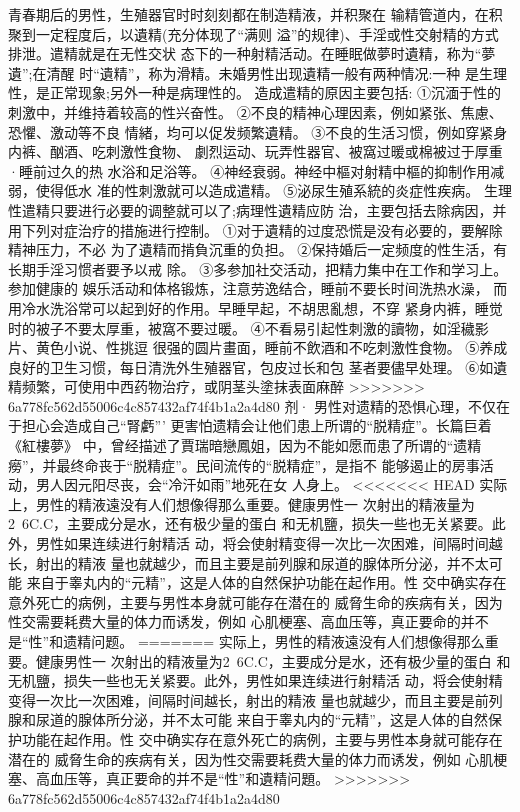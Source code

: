 \documentclass[12pt,UTF8]{ctexbook}
\begin{document}
青春期后的男性，生殖器官时时刻刻都在制造精液，并积聚在
输精管道内，在积聚到一定程度后，以遺精(充分体现了“满则
溢”的规律)、手淫或性交射精的方式排泄。遣精就是在无性交状
态下的一种射精活动。在睡眠做夢时遺精，称为“夢遺”;在清醒
时“遺精”，称为滑精。未婚男性出现遺精一般有两种情况:一种
是生理性，是正常现象;另外一种是病理性的。
造成遣精的原因主要包括:
①沉湎于性的刺激中，并维持着较高的性兴奋性。
②不良的精神心理因素，例如紧张、焦慮、恐懼、激动等不良
情緒，均可以促发频繁遺精。
③不良的生活习惯，例如穿紧身内裤、酗酒、吃刺激性食物、
劇烈运动、玩弄性器官、被窩过暖或棉被过于厚重·睡前过久的热
水浴和足浴等。
④神经衰弱。神经中樞对射精中樞的抑制作用减弱，使得低水
准的性刺激就可以造成遣精。
⑤泌尿生殖系統的炎症性疾病。
生理性遣精只要进行必要的调整就可以了;病理性遺精应防
治，主要包括去除病因，并用下列对症治疗的措施进行控制。
①对于遺精的过度恐慌是没有必要的，要解除精神压力，不必
为了遺精而掯負沉重的负担。
②保持婚后一定频度的性生活，有长期手淫习惯者要予以戒
除。
③多参加社交活动，把精力集中在工作和学习上。参加健康的
娛乐活动和体格锻炼，注意劳逸结合，睡前不要长时间洗热水澡，
而用冷水洗浴常可以起到好的作用。早睡早起，不胡思亂想，不穿
紧身内裤，睡觉时的被子不要太厚重，被窩不要过暖。
④不看易引起性刺激的讀物，如淫穢影片、黄色小说、性挑逗
很强的圆片畫面，睡前不飲酒和不吃刺激性食物。
⑤养成良好的卫生习惯，每日清洗外生殖器官，包皮过长和包
茎者要儘早处理。
⑥如遺精频繁，可使用中西药物治疗，或阴茎头塗抹表面麻醉
>>>>>>> 6a778fc562d55006c4c857432af74f4b1a2a4d80
剂·
男性对遗精的恐惧心理，不仅在于担心会造成自己“腎虧”’
更害怕遗精会让他们患上所谓的“脱精症”。长篇巨着《紅樓夢》
中，曾经描述了賈瑞暗戀鳳姐，因为不能如愿而患了所谓的“遗精
癆”，并最终命丧于“脱精症”。民间流传的“脱精症”，是指不
能够遏止的房事活动，男人因元阳尽丧，会“冷汗如雨”地死在女
人身上。
<<<<<<< HEAD
实际上，男性的精液遠没有人们想像得那么重要。健康男性一
次射出的精液量为2~6C.C，主要成分是水，还有极少量的蛋白
和无机鹽，损失一些也无关紧要。此外，男性如果连续进行射精活
动，将会使射精变得一次比一次困难，间隔时间越长，射出的精液
量也就越少，而且主要是前列腺和尿道的腺体所分泌，并不太可能
来自于睾丸内的“元精”，这是人体的自然保护功能在起作用。性
交中确实存在意外死亡的病例，主要与男性本身就可能存在潜在的
威脅生命的疾病有关，因为性交需要耗费大量的体力而诱发，例如
心肌梗塞、高血压等，真正要命的并不是“性”和遗精问题。
=======
实际上，男性的精液遠没有人们想像得那么重要。健康男性一
次射出的精液量为2~6C.C，主要成分是水，还有极少量的蛋白
和无机鹽，损失一些也无关紧要。此外，男性如果连续进行射精活
动，将会使射精变得一次比一次困难，间隔时间越长，射出的精液
量也就越少，而且主要是前列腺和尿道的腺体所分泌，并不太可能
来自于睾丸内的“元精”，这是人体的自然保护功能在起作用。性
交中确实存在意外死亡的病例，主要与男性本身就可能存在潜在的
威脅生命的疾病有关，因为性交需要耗费大量的体力而诱发，例如
心肌梗塞、高血压等，真正要命的并不是“性”和遺精问題。
>>>>>>> 6a778fc562d55006c4c857432af74f4b1a2a4d80
\end{document}
